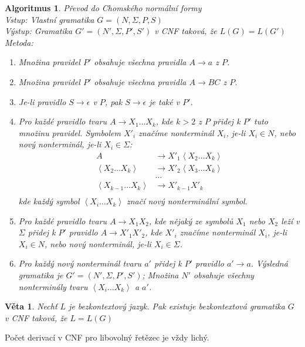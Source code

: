 \documentclass[a4paper, 11pt]{report}
\newtheorem{veta}{Věta}[chapter]
\newtheorem{alg}{Algoritmus}[chapter]
\begin{document}
\begin{alg}
Převod do Chomského normální formy\\
Vstup: Vlastní gramatika $G = (N, \Sigma, P, S)$\\
Výstup: Gramatika $G' = (N', \Sigma, P', S')$ v CNF taková, že $L(G) = L(G')$\\
Metoda:
\begin{enumerate}
	\item Množina pravidel $P'$ obsahuje všechna pravidla $A \to a$ z $P$.
	\item Množina pravidel $P'$ obsahuje všechna pravidla $A \to BC$ z $P$.
	\item Je-li pravidlo $S \to \epsilon$ v $P$, pak $S \to \epsilon$ je také v $P'$.
	\item Pro každé pravidlo tvaru $A \to X_1 \dots X_k$, kde $k > 2$ z $P$ přidej k $P'$ tuto množinu pravidel. Symbolem $X'_i$ značíme nonterminál $X_i$, je-li  $X_i \in N$, nebo nový nonterminál, je-li $X_i \in \Sigma$:
	\begin{align*}
		A								&\to X'_1 \left<X_2 \dots X_k \right> \\
		\left<X_2 \dots X_k \right>		&\to X'_2 \left<X_3 \dots X_k \right> \\
										& \hdots \\
		\left<X_{k-1} \dots X_k \right>	&\to X'_{k-1} X'_k \\
	\end{align*}
	kde každý symbol $\left<X_i \dots X_k \right>$ značí nový nonterminální symbol.
	\item Pro každé pravidlo tvaru $A \to X_1 X_2$, kde nějaký ze symbolů $X_1$ nebo $X_2$ leží v $\Sigma$ přidej k $P'$ pravidlo $A \to X'_1 X'_2$, kde $X'_i$ značíme nonterminál $X_i$, je-li $X_i \in N$, nebo nový nonterminál, je-li $X_i \in \Sigma$.
	\item Pro každý nový nonterminál tvaru $a'$ přidej k $P'$ pravidlo $a' \to a$. Výsledná gramatika je $G' = (N', \Sigma, P', S')$; Množina $N'$ obsahuje všechny nonterminály tvaru $\left<X_i \dots X_k \right>$ a $a'$.
\end{enumerate}
\end{alg}

\begin{veta}
Nechť $L$ je bezkontextový jazyk. Pak existuje bezkontextová gramatika $G$ v CNF taková, že $L = L(G)$
\end{veta}

Počet derivací v CNF pro libovolný řetězec je vždy lichý.
\end{document}
